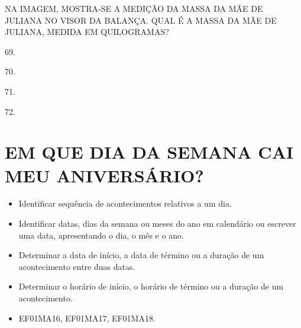 NA IMAGEM, MOSTRA-SE A MEDIÇÃO DA MASSA DA MÃE DE JULIANA NO VISOR DA
BALANÇA. QUAL É A MASSA DA MÃE DE JULIANA, MEDIDA EM QUILOGRAMAS?

\begin{escolha}
\item 69.

\item 70.

\item 71.

\item 72.
\end{escolha}

\chapter[{EM QUE DIA DA SEMANA CAI MEU ANIVERSÁRIO?}]{\large EM QUE DIA DA SEMANA CAI MEU ANIVERSÁRIO?}



\begin{itemize}
\item Identificar sequência de acontecimentos relativos a um dia.
\item Identificar datas, dias da semana ou meses do ano em calendário ou
escrever uma data, apresentando o dia, o mês e o ano.
\item Determinar a data de início, a data de término ou a duração de um
acontecimento entre duas datas.
\item Determinar o horário de início, o horário de término ou a duração de
um acontecimento.
\end{itemize}


\begin{itemize}\enlargethispage{2\baselineskip}
\item EF01MA16, EF01MA17, EF01MA18.
\end{itemize}


